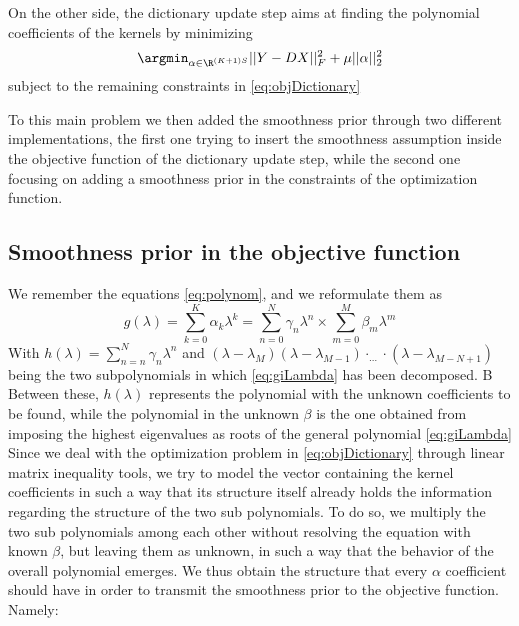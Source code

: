 On the other side, the dictionary update step aims at finding the polynomial coefficients of the kernels by minimizing
\begin{equation}
  \argmin_{\alpha \in \R^{(K+1)S}} ||Y - DX||^2_F + \mu||\alpha||_2^2
\end{equation}
subject to the remaining constraints in \autoref{eq:objDictionary}

To this main problem we then added the smoothness prior through two different implementations, the first one trying to insert the smoothness assumption inside the objective function of the dictionary update step, while the second one focusing on adding a smoothness prior in the constraints of the optimization function.

\subsection{Smoothness prior in the objective function}
We remember the equations \ref{eq:polynom}, and we reformulate them as
\begin{equation}
  g(\lambda) = \sum_{k=0}^K\alpha_k \lambda^k = \sum_{n=0}^N\gamma_n \lambda^n \times \sum_{m=0}^M  \beta_m \lambda^m
  \label{eq:giLambda}
\end{equation}
With $h(\lambda) = \sum_{n=n}^N \gamma_n \lambda^n$ and $(\lambda - \lambda_M)(\lambda - \lambda_{M-1})\cdot_{\dots}\cdot (\lambda - \lambda_{M - N +1})$ being the two subpolynomials in which \ref{eq:giLambda} has been decomposed. B Between these, $h(\lambda)$ represents the polynomial with the unknown coefficients to be found, while the polynomial in the unknown $\beta$ is the one obtained from imposing the highest eigenvalues as roots of the general polynomial \ref{eq:giLambda}  Since we deal with the optimization problem in \autoref{eq:objDictionary} through linear matrix inequality tools, we try to model the vector containing the kernel coefficients in such a way that its structure itself already holds the information regarding the structure of the two sub polynomials. To do so, we multiply the two sub polynomials among each other without resolving the equation with known $\beta$, but leaving them as unknown, in such a way that the behavior of the overall polynomial emerges. We thus obtain the structure that every $\alpha$ coefficient should have in order to transmit the smoothness prior to the objective function. Namely:
